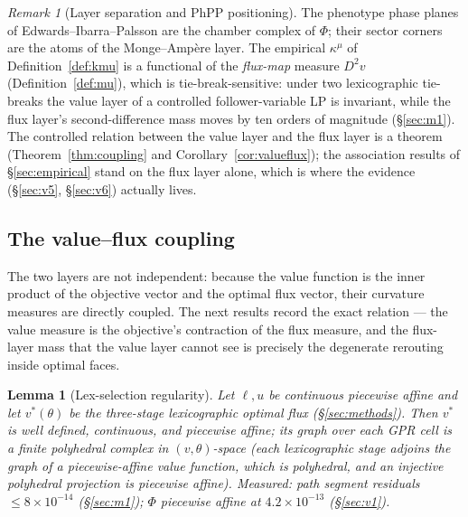 \documentclass[11pt,a4paper]{article}
\theoremstyle{plain}
\newtheorem{lemma}[theorem]{Lemma}
\theoremstyle{definition}
\theoremstyle{remark}
\newtheorem{remark}[theorem]{Remark}
\newcommand{\kmu}{\kappa^{\mu}}
\begin{document}
\begin{remark}[Layer separation and PhPP positioning]\label{rem:layersep}
The phenotype phase planes of Edwards--Ibarra--Palsson
\citep{edwards2001, ibarra2002} are the chamber
complex of $\Phi$; their sector corners are the atoms of the
Monge--Amp\`ere layer. The empirical $\kmu$ of
Definition~\ref{def:kmu} is a functional of the \emph{flux-map} measure
$D^2 v$ (Definition~\ref{def:mu}), which is tie-break-sensitive: under
two lexicographic tie-breaks the value layer of a controlled
follower-variable LP is invariant, while the flux layer's
second-difference mass moves by ten orders of magnitude (\S\ref{sec:m1}). The
controlled relation between the value layer and the flux layer is
a theorem (Theorem~\ref{thm:coupling} and
Corollary~\ref{cor:valueflux}); the association results of
\S\ref{sec:empirical} stand on the flux layer alone, which is where
the evidence (\S\ref{sec:v5}, \S\ref{sec:v6}) actually lives.
\end{remark}

\subsection{The value--flux coupling}

The two layers are not independent: because the value function is the
inner product of the objective vector and the optimal flux vector,
their curvature measures are directly coupled. The next results
record the exact relation --- the value measure is the objective's
contraction of the flux measure, and the flux-layer mass that the value
layer cannot see is precisely the degenerate rerouting inside optimal
faces.

\begin{lemma}[Lex-selection regularity]\label{lem:lex}
Let $\ell, u$ be continuous piecewise affine and let $v^*(\theta)$ be
the three-stage lexicographic optimal flux (\S\ref{sec:methods}).
Then $v^*$ is well defined, continuous, and piecewise affine; its
graph over each GPR cell is a finite polyhedral complex in
$(v,\theta)$-space (each
lexicographic stage adjoins the graph of a piecewise-affine value
function, which is polyhedral, and an injective polyhedral projection
is piecewise affine). Measured: path segment residuals $\le 8 \times 10^{-14}$ (\S\ref{sec:m1}); $\Phi$ piecewise affine at $4.2 \times 10^{-13}$ (\S\ref{sec:v1}).
\end{lemma}
\end{document}
